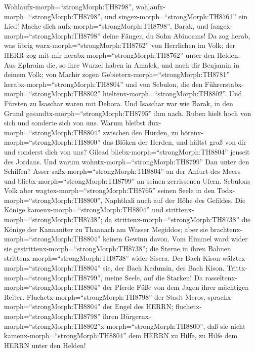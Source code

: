 Wohlaufx-morph=``strongMorph:TH8798'',
wohlaufx-morph=``strongMorph:TH8798'', und
singex-morph=``strongMorph:TH8761'' ein Lied! Mache dich
aufx-morph=``strongMorph:TH8798'', Barak, und
fangex-morph=``strongMorph:TH8798'' deine Fänger, du Sohn Abinoams!
 Da zog herab, was übrig warx-morph=``strongMorph:TH8762''
von Herrlichen im Volk; der HERR zog mit mir
herabx-morph=``strongMorph:TH8762'' unter den Helden.  Aus
Ephraim die, so ihre Wurzel haben in Amalek, und nach dir Benjamin in
deinem Volk; von Machir zogen Gebieterx-morph=``strongMorph:TH8781''
herabx-morph=``strongMorph:TH8804'' und von Sebulon, die den
Führerstabx-morph=``strongMorph:TH8802''
hieltenx-morph=``strongMorph:TH8802''.  Und Fürsten zu
Isaschar waren mit Debora. Und Isaschar war wie Barak, in den Grund
gesandtx-morph=``strongMorph:TH8795'' ihm nach. Ruben hielt hoch von
sich und sonderte sich von uns.  Warum bleibst
dux-morph=``strongMorph:TH8804'' zwischen den Hürden, zu
hörenx-morph=``strongMorph:TH8800'' das Blöken der Herden, und hältst
groß von dir und sonderst dich von uns?  Gilead
bliebx-morph=``strongMorph:TH8804'' jenseit des Jordans. Und warum
wohntx-morph=``strongMorph:TH8799'' Dan unter den Schiffen? Asser
saßx-morph=``strongMorph:TH8804'' an der Anfurt des Meers und
bliebx-morph=``strongMorph:TH8799'' an seinen zerrissenen Ufern.
 Sebulons Volk aber wagtex-morph=``strongMorph:TH8765''
seinen Seele in den Todx-morph=``strongMorph:TH8800'', Naphthali auch
auf der Höhe des Gefildes.  Die Könige
kamenx-morph=``strongMorph:TH8804'' und
strittenx-morph=``strongMorph:TH8738''; da
strittenx-morph=``strongMorph:TH8738'' die Könige der Kanaaniter zu
Thaanach am Wasser Megiddos; aber sie
brachtenx-morph=``strongMorph:TH8804'' keinen Gewinn davon.
 Vom Himmel ward wider sie
gestrittenx-morph=``strongMorph:TH8738''; die Sterne in ihren Bahnen
strittenx-morph=``strongMorph:TH8738'' wider Sisera.  Der
Bach Kison wälztex-morph=``strongMorph:TH8804'' sie, der Bach Kedumin,
der Bach Kison. Trittx-morph=``strongMorph:TH8799'', meine Seele, auf
die Starken!  Da rasseltenx-morph=``strongMorph:TH8804''
der Pferde Füße von dem Jagen ihrer mächtigen Reiter. 
Fluchetx-morph=``strongMorph:TH8798'' der Stadt Meros,
sprachx-morph=``strongMorph:TH8804'' der Engel des HERRN;
fluchetx-morph=``strongMorph:TH8798'' ihren
Bürgernx-morph=``strongMorph:TH8802''x-morph=``strongMorph:TH8800'', daß
sie nicht kamenx-morph=``strongMorph:TH8804'' dem HERRN zu Hilfe, zu
Hilfe dem HERRN unter den Helden! 
